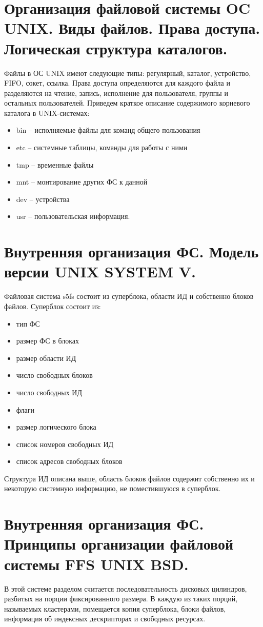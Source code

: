 \documentclass[a4paper,12pt,titlepage,finall]{article}
\begin{document}
\section{Организация файловой системы OC UNIX. Виды файлов.
Права доступа. Логическая структура каталогов.}
Файлы в ОС UNIX имеют следующие типы: регулярный, каталог, устройство, FIFO, сокет, ссылка. Права доступа определяются для каждого файла и разделяются на чтение, запись, исполнение для пользователя, группы и остальных пользователей. Приведем краткое описание содержимого корневого каталога в UNIX-системах:
\begin{itemize}
    \item bin -- исполняемые файлы для команд общего пользования 
    \item etc -- системные таблицы, команды для работы с ними 
    \item tmp -- временные файлы
    \item mnt -- монтирование других ФС к данной
    \item dev -- устройства
    \item usr -- пользовательская информация.
\end{itemize}

\section{Внутренняя организация ФС. Модель версии UNIX
SYSTEM V.}
Файловая система s5fs состоит из суперблока, области ИД и собственно блоков файлов. Суперблок состоит из:
\begin{itemize}
    \item тип ФС
    \item размер ФС в блоках
    \item размер области ИД
    \item число свободных блоков
    \item число свободных ИД
    \item флаги
    \item размер логического блока
    \item список номеров свободных ИД
    \item список адресов свободных блоков
\end{itemize}
Структура ИД описана выше, область блоков файлов содержит собственно их и некоторую системную информацию, не поместившуюся в суперблок.

\section{Внутренняя организация ФС. Принципы организации
файловой системы FFS UNIX BSD.}
В этой системе разделом считается последовательность дисковых цилиндров, разбитых на порции фиксированного размера. В каждую из таких порций, называемых кластерами, помещается копия суперблока, блоки файлов, информация об индексных дескрипторах и свободных ресурсах.
\end{document}
